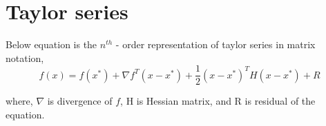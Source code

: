 \section{Taylor series}
Below equation is the $n^{th}$ - order representation of taylor series in matrix notation,
\begin{equation}
    f(x) = f(x^*) + \nabla f^T (x - x^*) + \frac{1}{2} (x - x^*)^T H (x - x ^*) + R 
    \label{Taylor_equation}
\end{equation}

where, $\nabla$ is divergence of $f$, H is Hessian matrix, and R is residual of the equation.